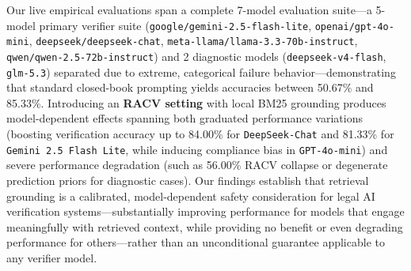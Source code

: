 \documentclass[conference]{IEEEtran}
\begin{document}
Our live empirical evaluations span a complete 7-model evaluation suite—a 5-model primary verifier suite (\texttt{google/gemini-2.5-flash-lite}, \texttt{openai/gpt-4o-mini}, \texttt{deepseek/deepseek-chat}, \texttt{meta-llama/llama-3.3-70b-instruct}, \texttt{qwen/qwen-2.5-72b-instruct}) and 2 diagnostic models (\texttt{deepseek-v4-flash}, \texttt{glm-5.3}) separated due to extreme, categorical failure behavior—demonstrating that standard closed-book prompting yields accuracies between 50.67\% and 85.33\%. Introducing an \textbf{RACV setting} with local BM25 grounding produces model-dependent effects spanning both graduated performance variations (boosting verification accuracy up to 84.00\% for \texttt{DeepSeek-Chat} and 81.33\% for \texttt{Gemini 2.5 Flash Lite}, while inducing compliance bias in \texttt{GPT-4o-mini}) and severe performance degradation (such as 56.00\% RACV collapse or degenerate prediction priors for diagnostic cases). Our findings establish that retrieval grounding is a calibrated, model-dependent safety consideration for legal AI verification systems—substantially improving performance for models that engage meaningfully with retrieved context, while providing no benefit or even degrading performance for others—rather than an unconditional guarantee applicable to any verifier model.

\end{document}
